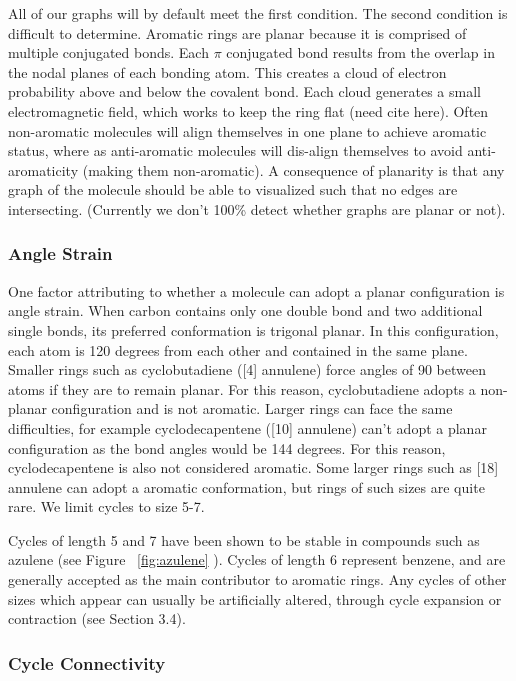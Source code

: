 \documentclass[12pt]{article}
\begin{document}
All of our graphs will by default meet the first condition. The second condition is difficult to determine. Aromatic rings are planar because it is comprised of multiple conjugated bonds. Each $\pi$ conjugated bond results from the overlap in the nodal planes of each bonding atom. This creates a cloud of electron probability above and below the covalent bond. Each cloud generates a small electromagnetic field, which works to keep the ring flat (need cite here). Often non-aromatic molecules will align themselves in one plane to achieve aromatic status, where as anti-aromatic molecules will dis-align themselves to avoid anti-aromaticity (making them non-aromatic). A consequence of planarity is that any graph of the molecule should be able to visualized such that no edges are intersecting. (Currently we don't 100\% detect whether graphs are planar or not).

\subsubsection{Angle Strain}

One factor attributing to whether a molecule can adopt a planar configuration is angle strain. When carbon contains only one double bond and two additional single bonds, its preferred conformation is trigonal planar. In this configuration, each atom is 120 degrees from each other and contained in the same plane. Smaller rings such as cyclobutadiene ([4] annulene) force angles of 90 between atoms if they are to remain planar. For this reason, cyclobutadiene adopts a non-planar configuration and is not aromatic. Larger rings can face the same difficulties, for example cyclodecapentene ([10] annulene) can't adopt a planar configuration as the bond angles would be 144 degrees. For this reason, cyclodecapentene is also not considered aromatic. Some larger rings such as [18] annulene can adopt a aromatic conformation, but rings of such sizes are quite rare.  We limit cycles to size 5-7. 

Cycles of length 5 and 7 have been shown to be stable in compounds such as azulene (see Figure ~\ref{fig:azulene} ). Cycles of length 6 represent benzene, and are generally accepted as the main contributor to aromatic rings. Any cycles of other sizes which appear can usually be artificially altered, through cycle expansion or contraction (see Section 3.4).

\subsubsection{Cycle Connectivity}
\end{document}
